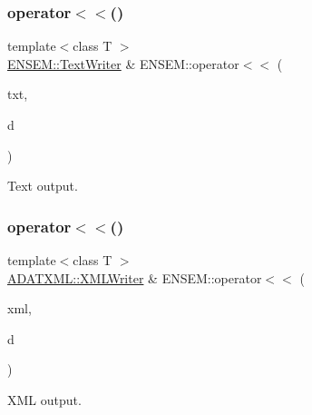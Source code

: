 \subsubsection{\texorpdfstring{operator$<$$<$()}{operator<<()}\hspace{0.1cm}{\footnotesize\ttfamily [2/3]}}
{\footnotesize\ttfamily template$<$class T $>$ \\
\mbox{\hyperlink{classENSEM_1_1TextWriter}{E\+N\+S\+E\+M\+::\+Text\+Writer}} \& E\+N\+S\+E\+M\+::operator$<$$<$ (\begin{DoxyParamCaption}\item[{\mbox{\hyperlink{classENSEM_1_1TextWriter}{E\+N\+S\+E\+M\+::\+Text\+Writer}} \&}]{txt,  }\item[{const \mbox{\hyperlink{classENSEM_1_1OVector}{O\+Vector}}$<$ T $>$ \&}]{d }\end{DoxyParamCaption})\hspace{0.3cm}{\ttfamily [inline]}}



Text output. 

\mbox{\label{group__obsvector_ga21a786931a7efb82964106799b422557}} 
\subsubsection{\texorpdfstring{operator$<$$<$()}{operator<<()}\hspace{0.1cm}{\footnotesize\ttfamily [3/3]}}
{\footnotesize\ttfamily template$<$class T $>$ \\
\mbox{\hyperlink{classADATXML_1_1XMLWriter}{A\+D\+A\+T\+X\+M\+L\+::\+X\+M\+L\+Writer}} \& E\+N\+S\+E\+M\+::operator$<$$<$ (\begin{DoxyParamCaption}\item[{\mbox{\hyperlink{classADATXML_1_1XMLWriter}{A\+D\+A\+T\+X\+M\+L\+::\+X\+M\+L\+Writer}} \&}]{xml,  }\item[{const \mbox{\hyperlink{classENSEM_1_1OVector}{O\+Vector}}$<$ T $>$ \&}]{d }\end{DoxyParamCaption})\hspace{0.3cm}{\ttfamily [inline]}}



X\+ML output. 

